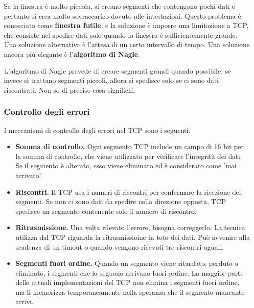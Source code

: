        \vspace{3mm}
        
        Se la finestra è molto piccola, si creano segmenti che contengono pochi dati e pertanto si crea molto sovraccarico dovuto alle intestazioni. Questo problema è conosciuto come \textbf{finestra futile}, e la soluzione è imporre una limitazione a TCP, che consiste nel spedire dati solo quando la finestra è sufficientemente grande. Una soluzione alternativa è l'attesa di un certo intervallo di tempo. Una soluzione ancora più elegante è l'\textbf{algoritmo di Nagle}.
        
        \vspace{3mm}
        
        L'algoritmo di Nagle prevede di creare segmenti grandi quando possibile; se invece si trattano segmenti piccoli, allora si spedisce solo se ci sono dati riscontrati. Non so di preciso cosa significhi.
        
    \subsubsection{Controllo degli errori}
    
        I meccanismi di controllo degli errori nel TCP sono i seguenti.
        
        \begin{itemize}
            \item 
                \textbf{Somma di controllo.} Ogni segmento TCP include un campo di 16 bit per la somma di controllo, che viene utilizzato per verificare l'integrità dei dati. Se il segmento è alterato, esso viene eliminato ed è considerato come 'mai arrivato'.
            \item
                \textbf{Riscontri.} Il TCP usa i numeri di riscontri per confermare la ricezione dei segmenti. Se non ci sono dati da spedire nella direzione opposta, TCP spedisce un segmento contenente solo il numero di riscontro.
                
            \item
                \textbf{Ritrasmissione.} Una volta rilevato l'errore, bisogna correggerlo. La tecnica utilizza dal TCP riguarda la ritrasmissioine in toto dei dati. Può avvenire alla scadenza di un timout o quando vengono ricevuti tre riscontri uguali. 
            
            \item
               \textbf{Segmenti fuori ordine.} Quando un segmento viene ritardato, perduto o eliminato, i segmenti che lo seguono arrivano fuori ordine. La maggior parte delle attuali implementazioni del TCP non elimina i segmenti fuori ordine, ma li memorizza temporaneamente nella speranza che il segmento mancante arrivi. 
        \end{itemize}
        
